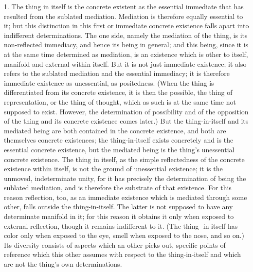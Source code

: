 1. The thing in itself is the concrete existent
as the essential immediate that has resulted
from the sublated mediation.
Mediation is therefore equally essential to it;
but this distinction in this first or immediate concrete
existence falls apart into indifferent determinations.
The one side, namely the mediation of the thing,
is its non-reflected immediacy,
and hence its being in general;
and this being, since it is at the same time determined as mediation,
is an existence which is other to itself,
manifold and external within itself.
But it is not just immediate existence;
it also refers to the sublated mediation and the essential immediacy;
it is therefore immediate existence as unessential, as positedness.
(When the thing is differentiated from its concrete existence,
it is then the possible, the thing of representation, or the thing of thought,
which as such is at the same time not supposed to exist.
However, the determination of possibility and of the opposition of
the thing and its concrete existence comes later.)
But the thing-in-itself and its mediated being are
both contained in the concrete existence,
and both are themselves concrete existences;
the thing-in-itself exists concretely
and is the essential concrete existence,
but the mediated being is the thing's unessential concrete existence.
The thing in itself, as the simple reflectedness of the concrete existence
within itself, is not the ground of unessential existence; it is the unmoved,
indeterminate unity, for it has precisely the determination of being the
sublated mediation, and is therefore the substrate of that existence. For this
reason reflection, too, as an immediate existence which is mediated through
some other, falls outside the thing-in-itself. The latter is not supposed to
have any determinate manifold in it; for this reason it obtains it only when
exposed to external reflection, though it remains indifferent to it. (The thing-
in-itself has color only when exposed to the eye, smell when exposed to
the nose, and so on.) Its diversity consists of aspects which an other picks
out, specific points of reference which this other assumes with respect to
the thing-in-itself and which are not the thing's own determinations.

